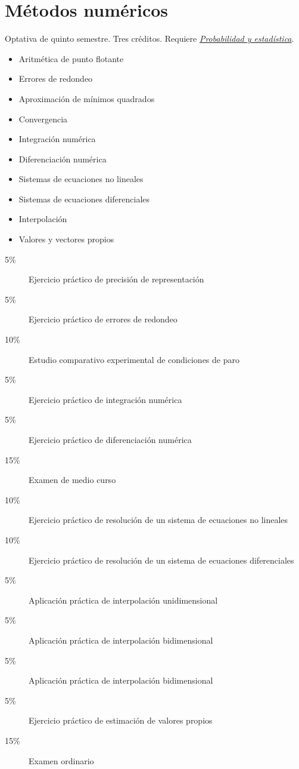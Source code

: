 \documentclass{article}
\begin{document}
\begin{multicols}{4}
\vfill\null \columnbreak

\hypertarget{mn}{\section*{M\'{e}todos num\'{e}ricos}}

Optativa de quinto semestre. Tres cr\'{e}ditos. Requiere \hyperlink{pye}{\em
  Probabilidad y estad\'{i}stica}.

\begin{itemize}
\item{Aritm\'{e}tica de punto flotante}
\item{Errores de redondeo}
\item{Aproximaci\'{o}n de m\'{i}nimos quadrados}  
\item{Convergencia}
\item{Integraci\'{o}n num\'{e}rica}
\item{Diferenciaci\'{o}n num\'{e}rica}
\item{Sistemas de ecuaciones no lineales}
\item{Sistemas de ecuaciones diferenciales}  
\item{Interpolaci\'{o}n}
\item{Valores y vectores propios}

\end{itemize}

\begin{description}
\item[5\%]{Ejercicio pr\'{a}ctico de precisi\'{o}n de representaci\'{o}n}
\item[5\%]{Ejercicio pr\'{a}ctico de errores de redondeo}
\item[10\%]{Estudio comparativo experimental de condiciones de paro}
\item[5\%]{Ejercicio pr\'{a}ctico de integraci\'{o}n num\'{e}rica}
\item[5\%]{Ejercicio pr\'{a}ctico de diferenciaci\'{o}n num\'{e}rica}  
\item[15\%]{Examen de medio curso}  
\item[10\%]{Ejercicio pr\'{a}ctico de resoluci\'{o}n de un sistema de
  ecuaciones no lineales}
\item[10\%]{Ejercicio pr\'{a}ctico de resoluci\'{o}n de un sistema de
  ecuaciones diferenciales}  
\item[5\%]{Aplicaci\'{o}n pr\'{a}ctica de interpolaci\'{o}n unidimensional}
\item[5\%]{Aplicaci\'{o}n pr\'{a}ctica de interpolaci\'{o}n bidimensional}
\item[5\%]{Aplicaci\'{o}n pr\'{a}ctica de interpolaci\'{o}n bidimensional}    
\item[5\%]{Ejercicio pr\'{a}ctico de estimaci\'{o}n de valores propios}
\item[15\%]{Examen ordinario}
\end{description}  


\end{multicols}
\end{document}
